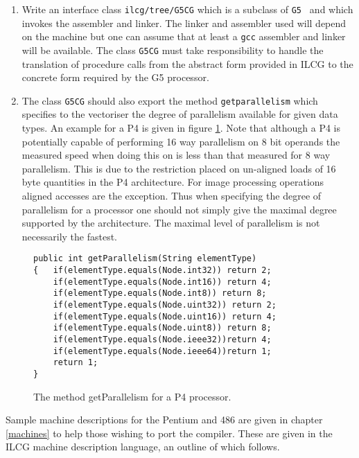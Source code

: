 {{\begin{enumerate}
\begin{enumerate}
\item \texttt{java ilcg.ILCG cpus/G5.ilc ilcg/tree/G5.java G5}
\end{enumerate}
\item Write an interface class {\tt ilcg/tree/G5CG} which is a subclass of 
{\tt G5 } and which
invokes the assembler and linker. The linker and assembler used will depend
on the machine but one can assume that at least a {\tt gcc} assembler and
linker will be available. The class {\tt G5CG} must take responsibility to
handle the translation of procedure calls from the abstract form provided
in ILCG to the concrete form required by the G5 processor.
\item
The class {\tt G5CG} should also export the method {\tt getparallelism}
which specifies to the vectoriser the degree of parallelism available
for given data types. An example for a P4 is given in figure \ref{getparallelism}.
Note that although a P4 is potentially capable of performing 16 way 
parallelism on 8 bit operands the measured speed  when doing this 
on is less than that measured for 8 way parallelism. This is due
to the restriction placed on un-aligned loads of 16 byte quantities
in the P4 architecture. For image processing operations aligned accesses
are the exception. Thus when specifying
the degree of parallelism for a processor one should not simply give
the maximal degree supported by the architecture. The maximal level
of parallelism is not necessarily the fastest.
\end{enumerate}
\begin{figure}
\begin{verbatim}
public int getParallelism(String elementType) 
{   if(elementType.equals(Node.int32)) return 2;
    if(elementType.equals(Node.int16)) return 4;
    if(elementType.equals(Node.int8)) return 8;   
    if(elementType.equals(Node.uint32)) return 2;
    if(elementType.equals(Node.uint16)) return 4;
    if(elementType.equals(Node.uint8)) return 8;  
    if(elementType.equals(Node.ieee32))return 4; 
    if(elementType.equals(Node.ieee64))return 1;  
    return 1; 
} 
\end{verbatim}
\caption{The method getParallelism for a P4 processor.
   }
\label{getparallelism}
\end{figure}
Sample machine descriptions for the Pentium and 486  are given in chapter \ref{machines}
to help
those wishing to port the compiler.  
These are given in the  ILCG machine description language, an outline of which follows.



}}
